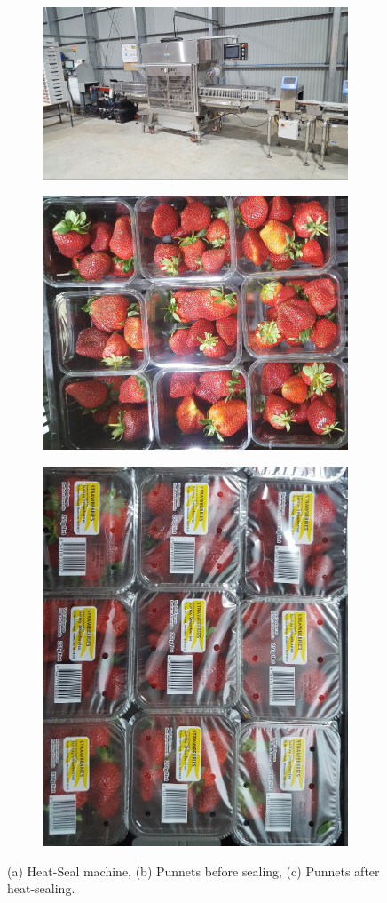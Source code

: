 \documentclass[fleqn,twoside]{article}
\begin{document}
\begin{figure}[ht!]
	\centering
	\begin{subfigure}{\textwidth}
		\centering
		\includegraphics[width=.8\linewidth]{heat_seal.jpg}
		\caption{}
		\label{fig:heat_seal}
	\end{subfigure}%
	
	\begin{subfigure}{.5\textwidth}
		\centering
		\includegraphics[width=.6\linewidth]{unsealed_punnets.jpg}
		\caption{}
		\label{fig:unsealed_punnets}
	\end{subfigure}%
	\begin{subfigure}{.5\textwidth}
		\centering
		\includegraphics[width=.5\linewidth, angle=90]{sealed_punnets.jpg}
		\caption{}
		\label{fig:sealed_punnets}
	\end{subfigure}%
	\caption{(a) Heat-Seal machine, (b) Punnets before sealing, (c) Punnets after heat-sealing.}
	\label{fig:HS}
\end{figure}
\end{document}
